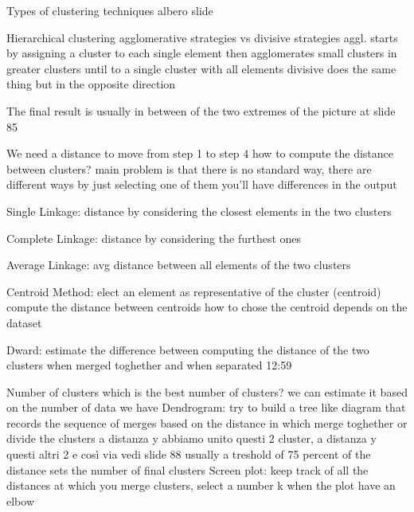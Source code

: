         Types of clustering techniques 
            albero slide 

            Hierarchical clustering
                agglomerative strategies vs divisive strategies 
                    aggl. starts by assigning a cluster to each single element 
                        then agglomerates small clusters in greater clusters 
                        until to a single cluster with all elements 
                    divisive does the same thing but in the opposite direction

                The final result is usually in between of the two extremes of the picture at slide 85

                We need a distance to move from step 1 to step 4
                    how to compute the distance between clusters?
                        main problem is that there is no standard way, there are different ways
                        by just selecting one of them you'll have differences in the output

                    Single Linkage: distance by considering the closest elements in the two clusters

                    Complete Linkage: distance by considering the furthest ones 

                    Average Linkage: avg distance between all elements of the two clusters 

                    Centroid Method: elect an element as representative of the cluster (centroid)
                                    compute the distance between centroids 
                                    how to chose the centroid depends on the dataset 

                    Dward: estimate the difference between computing the distance of the two clusters
                            when merged toghether and when separated 12:59

                Number of clusters 
                    which is the best number of clusters?
                    we can estimate it based on the number of data we have 
                    Dendrogram: try to build a tree like diagram that records the sequence of merges based on the distance in which merge toghether or divide the clusters
                        a distanza y abbiamo unito questi 2 cluster, a distanza y questi altri 2 e così via vedi slide 88
                        usually a treshold of 75 percent of the distance sets the number of final clusters
                    Screen plot: keep track of all the distances at which you merge clusters,
                                select a number k when the plot have an elbow
                
